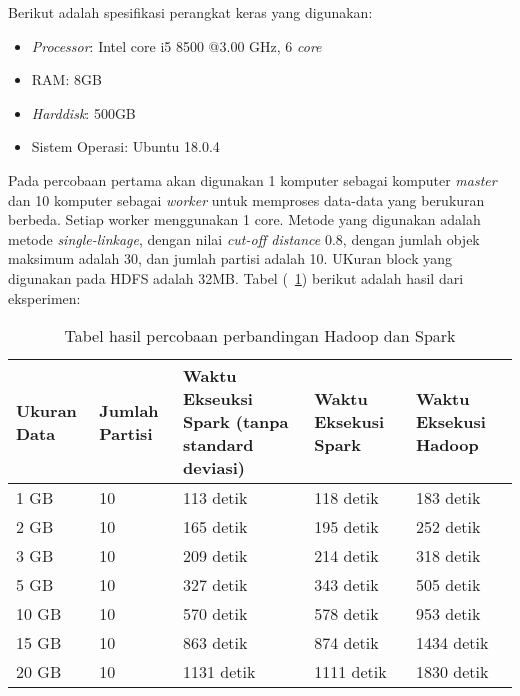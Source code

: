 Berikut adalah spesifikasi perangkat keras yang digunakan:

\begin{itemize}

\item \textit{Processor}: Intel core i5 8500 @3.00 GHz, 6 \textit{core}

\item RAM: 8GB

\item \textit{Harddisk}: 500GB

\item Sistem Operasi: Ubuntu 18.0.4

\end{itemize}


Pada percobaan pertama akan digunakan 1 komputer sebagai komputer \textit{master} dan 10 komputer sebagai \textit{worker} untuk memproses data-data yang berukuran berbeda. Setiap worker menggunakan 1 core. Metode yang digunakan adalah metode \textit{single-linkage}, dengan nilai \textit{cut-off distance} 0.8, dengan jumlah objek maksimum adalah 30, dan jumlah partisi adalah 10. UKuran block yang digunakan pada HDFS adalah 32MB. Tabel (~\ref{tab:spark10}) berikut adalah hasil dari eksperimen:

\begin{table}[H] 
	\centering 
	\caption{Tabel hasil percobaan perbandingan Hadoop dan Spark}
	\label{tab:spark10}
	\begin{tabular}{|p{1.5cm}|p{1cm}|p{4cm}|p{4cm}|p{3cm}|}
\hline
Ukuran Data & Jumlah Partisi & Waktu Ekseuksi Spark (tanpa standard deviasi) & Waktu Eksekusi Spark & Waktu Eksekusi Hadoop  \\
\hline
1 GB & 10 & 113 detik & 118 detik & 183 detik\\
\hline
2 GB & 10 & 165 detik & 195 detik & 252 detik\\
\hline
3 GB & 10 & 209 detik & 214 detik & 318 detik\\
\hline
5 GB & 10 & 327 detik & 343 detik & 505 detik\\
\hline
10 GB & 10 & 570 detik & 578 detik & 953 detik\\
\hline
15 GB & 10 & 863 detik & 874 detik & 1434 detik\\
\hline
20 GB & 10 & 1131 detik & 1111 detik & 1830 detik\\
\hline

\hline
	\end{tabular} 
\end{table}

